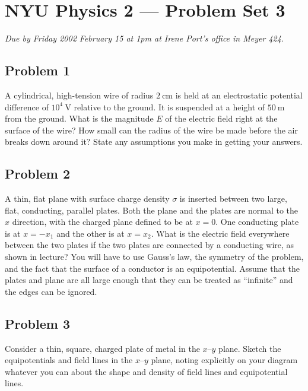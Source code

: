 \documentclass{article}
\begin{document}
\thispagestyle{empty}
\section*{NYU Physics 2 --- Problem Set 3}

\emph{Due by Friday 2002 February 15 at 1pm at Irene Port's office in
Meyer 424.}

\subsection*{Problem 1}

A cylindrical, high-tension wire of radius $2~\mathrm{cm}$ is held at
an electrostatic potential difference of $10^4~\mathrm{V}$ relative to
the ground.  It is suspended at a height of $50~\mathrm{m}$ from the
ground.  What is the magnitude $E$ of the electric field right at the
surface of the wire?  How small can the radius of the wire be made
before the air breaks down around it?  State any assumptions you make
in getting your answers.

\subsection*{Problem 2}

A thin, flat plane with surface charge density $\sigma$ is inserted
between two large, flat, conducting, parallel plates.  Both the plane
and the plates are normal to the $x$ direction, with the charged plane
defined to be at $x=0$.  One conducting plate is at $x= -x_1$ and the
other is at $x=x_2$.  What is the electric field everywhere between
the two plates if the two plates are connected by a conducting wire,
as shown in lecture?  You will have to use Gauss's law, the symmetry
of the problem, and the fact that the surface of a conductor is an
equipotential.  Assume that the plates and plane are all large enough
that they can be treated as ``infinite'' and the edges can be ignored.

\subsection*{Problem 3}

Consider a thin, square, charged plate of metal in the $x$--$y$ plane.
Sketch the equipotentials and field lines in the $x$--$y$ plane,
noting explicitly on your diagram whatever you can about the shape and
density of field lines and equipotential lines.
\end{document}
